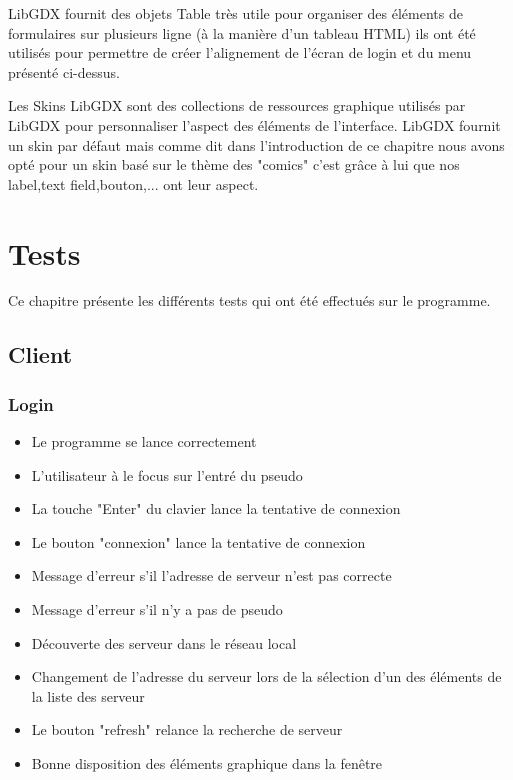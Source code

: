 \documentclass{report}
\begin{document}
LibGDX fournit des objets Table très utile pour organiser des éléments de formulaires sur plusieurs ligne
(à la manière d'un tableau HTML) ils ont été utilisés pour permettre de créer l'alignement de l'écran de login et du menu
présenté ci-dessus.

Les Skins LibGDX sont des collections de ressources graphique utilisés par LibGDX pour personnaliser l'aspect des éléments
de l'interface. LibGDX fournit un skin par défaut mais comme dit dans l'introduction de ce chapitre nous avons opté pour un skin
basé sur le thème des "comics" c'est grâce à lui que nos label,text field,bouton,... ont leur aspect.

\chapter{Tests}
Ce chapitre présente les différents tests qui ont été effectués sur le programme.
\section{Client}
\subsection{Login}
\begin{itemize}
  \item Le programme se lance correctement
  \item L'utilisateur à le focus sur l'entré du pseudo
  \item La touche "Enter" du clavier lance la tentative de connexion
  \item Le bouton "connexion" lance la tentative de connexion
  \item Message d'erreur s'il l'adresse de  serveur n'est pas correcte
  \item Message d'erreur s'il n'y a pas de pseudo
  \item Découverte des serveur dans le réseau local
  \item Changement de l'adresse du serveur lors de la sélection d'un des éléments de la liste des serveur
  \item Le bouton "refresh" relance la recherche de serveur
  \item Bonne disposition des éléments graphique dans la fenêtre

\end{itemize}
\end{document}
